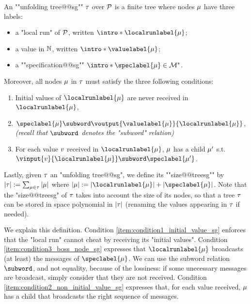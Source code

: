 \begin{definition}
\label{def:unfolding_tree_signature}
\AP An ""unfolding tree@@sg"" $\tau$ over $\mathcal{P}$ is
a finite tree where nodes $\mu$ have three labels:
\begin{itemize}
	\item a "local run" of $\mathcal{P}$, written $\intro*\localrunlabel{\node}$;
	
	\item a value in $\mathbb{N}$, written $\intro*\valuelabel{\node}$;
	
	\item a ""specification@@sg"" $\intro*\speclabel{\node} \in \messages^*$.
\end{itemize} 
Moreover, all nodes $\mu$ in $\tau$ must satisfy the three following conditions:
\begin{enumerate}[label= (\roman*), ref=(\roman*)]
	\item \label{item:condition1_initial_value_sg} Initial values of $\localrunlabel{\node}$ are never received in $\localrunlabel{\node}$, 
	\item \label{item:condition3_boss_node_sg} $\speclabel{\node} \subword \voutput{\valuelabel{\node}}{\localrunlabel{\node}}$, \emph{(recall that $\subword$ denotes the "subword" relation)}
	\item \label{item:condition2_non_initial_value_sg} For each value $v$ received in $\localrunlabel{\node}$, $\mu$ has a child $\mu'$ s.t. $\vinput{\aval}{\localrunlabel{\node}} \subword \speclabel{\node'}$.
\end{enumerate}

\AP Lastly, given $\tau$ an "unfolding tree@@sg", we define its ""size@@treesg"" by $|\tau| := \sum_{\mu \in \tau} |\mu|$ where $\size{\node} := \size{\localrunlabel{\node}} + \size{\speclabel{\node}}$. Note that the "size@@treesg" of $\tau$ takes into account the size of its nodes, so that a tree $\tau$ can be stored in space polynomial in $|\tau|$ (renaming the values appearing in $\tau$ if needed). 
\end{definition}

We explain this definition. Condition \ref{item:condition1_initial_value_sg} enforces that the "local run" cannot cheat by receiving its "initial values". 
 Condition \ref{item:condition3_boss_node_sg} expresses that $\localrunlabel{\node}$ broadcasts (at least) the messages of $\speclabel{\node}$. We can use the subword relation $\subword$, and not equality, because of the lossiness:  if some unecessary messages are broadcast, simply consider that they are not received.
Condition \ref{item:condition2_non_initial_value_sg} expresses that, for each value received, $\mu$ has a child that broadcasts the right sequence of messages.

